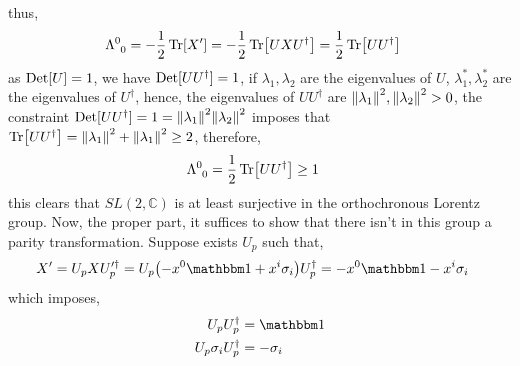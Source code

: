 thus,
\begin{align}
    \tensor{\Lambda}{^0_0}&=-\frac12\Tr[X']=-\frac12\Tr[UXU^\dagger]=\frac12\Tr[UU^\dagger]
\end{align}
as $\textup{Det} [U]=1$, we have $\textup{Det} [UU^\dagger]=1$, if $\lambda_1,\lambda_2$ are the eigenvalues of $U$, $\lambda_1^\ast,\lambda_2^\ast$ are the eigenvalues of 
$U^\dagger$, hence, the eigenvalues of $UU^\dagger$ are $\norm{\lambda_1}^2,\norm{\lambda_2}^2>0$, the constraint $\textup{Det} [UU^\dagger]= 1 =\norm{\lambda_1}^2\norm{\lambda_2}^2$ 
imposes that $\Tr[UU^\dagger] = \norm{\lambda_1}^2+\norm{\lambda_1}^2\geq 2$, therefore,
\begin{align}
    \tensor{\Lambda}{^0_0}&=\frac12\Tr[UU^\dagger]\geq 1
\end{align}
this clears that $SL(2,\mathbb C)$ is at least surjective in the orthochronous Lorentz group. Now, the proper part, it suffices to show that there isn't in 
this group a parity transformation. Suppose exists $U_p$ such that,
\begin{align}
    X' &= U_pXU_p'^\dagger=U_p\qty( -x^0 \mathbbm 1+x^i\sigma_i)U_p^\dagger = -x^0 \mathbbm 1-x^i\sigma_i
\end{align}
which imposes,
\begin{align}
    U_pU^\dagger_p&=\mathbbm 1\\
    U_p\sigma_iU^\dagger_p&=-\sigma_i
\end{align}

